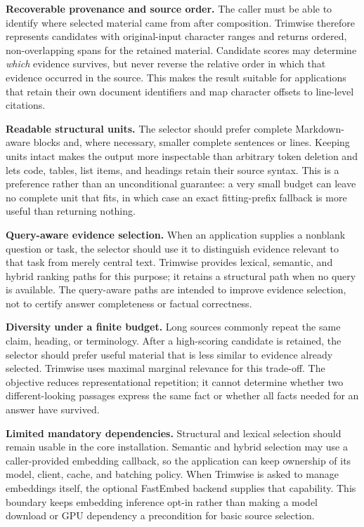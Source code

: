 \documentclass[
]{article}
\begin{document}
\textbf{Recoverable provenance and source order.} The caller must be
able to identify where selected material came from after composition.
Trimwise therefore represents candidates with original-input character
ranges and returns ordered, non-overlapping spans for the retained
material. Candidate scores may determine \emph{which} evidence survives,
but never reverse the relative order in which that evidence occurred in
the source. This makes the result suitable for applications that retain
their own document identifiers and map character offsets to line-level
citations.

\textbf{Readable structural units.} The selector should prefer complete
Markdown-aware blocks and, where necessary, smaller complete sentences
or lines. Keeping units intact makes the output more inspectable than
arbitrary token deletion and lets code, tables, list items, and headings
retain their source syntax. This is a preference rather than an
unconditional guarantee: a very small budget can leave no complete unit
that fits, in which case an exact fitting-prefix fallback is more useful
than returning nothing.

\textbf{Query-aware evidence selection.} When an application supplies a
nonblank question or task, the selector should use it to distinguish
evidence relevant to that task from merely central text. Trimwise
provides lexical, semantic, and hybrid ranking paths for this purpose;
it retains a structural path when no query is available. The query-aware
paths are intended to improve evidence selection, not to certify answer
completeness or factual correctness.

\textbf{Diversity under a finite budget.} Long sources commonly repeat
the same claim, heading, or terminology. After a high-scoring candidate
is retained, the selector should prefer useful material that is less
similar to evidence already selected. Trimwise uses maximal marginal
relevance for this trade-off. The objective reduces representational
repetition; it cannot determine whether two different-looking passages
express the same fact or whether all facts needed for an answer have
survived.

\textbf{Limited mandatory dependencies.} Structural and lexical
selection should remain usable in the core installation. Semantic and
hybrid selection may use a caller-provided embedding callback, so the
application can keep ownership of its model, client, cache, and batching
policy. When Trimwise is asked to manage embeddings itself, the optional
FastEmbed backend supplies that capability. This boundary keeps
embedding inference opt-in rather than making a model download or GPU
dependency a precondition for basic source selection.
\end{document}
